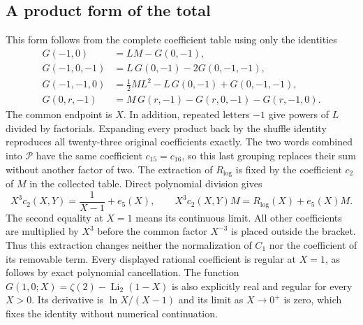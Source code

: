 \subsection{A product form of the total}
\label{sec:comp-total-energy-product}
\begingroup
\def\comptonproductlabel{eq:comp-total-energy-product}

\endgroup
This form follows from the complete coefficient table using only the identities
\begin{align}
G(-1,0)&=LM-G(0,-1),\\
G(-1,0,-1)&=L\,G(0,-1)-2G(0,-1,-1),\\
G(-1,-1,0)&=\tfrac12ML^2-L\,G(0,-1)+G(0,-1,-1),\\
G(0,r,-1)&=M\,G(r,-1)-G(r,0,-1)-G(r,-1,0).
\end{align}
The common endpoint is $X$. In addition, repeated letters $-1$ give powers of $L$ divided by factorials. Expanding every product back by the shuffle identity reproduces all twenty-three original coefficients exactly. The two words combined into $\mathcal P$ have the same coefficient $c_{15}=c_{16}$, so this last grouping replaces their sum without another factor of two.
The extraction of $R_{\log}$ is fixed by the coefficient $c_2$ of $M$ in the collected table. Direct polynomial division gives
\begin{equation}
 X^3c_2(X,Y)=\frac{1}{X-1}+e_5(X),\qquad X^3c_2(X,Y)M=R_{\log}(X)+e_5(X)M.
\end{equation}
The second equality at $X=1$ means its continuous limit. All other coefficients are multiplied by $X^3$ before the common factor $X^{-3}$ is placed outside the bracket. Thus this extraction changes neither the normalization of $C_1$ nor the coefficient of its removable term. Every displayed rational coefficient is regular at $X=1$, as follows by exact polynomial cancellation. The function $G(1,0;X)=\zeta(2)-\operatorname{Li}_2(1-X)$ is also explicitly real and regular for every $X>0$. Its derivative is $\ln X/(X-1)$ and its limit as $X\to0^+$ is zero, which fixes the identity without numerical continuation.
